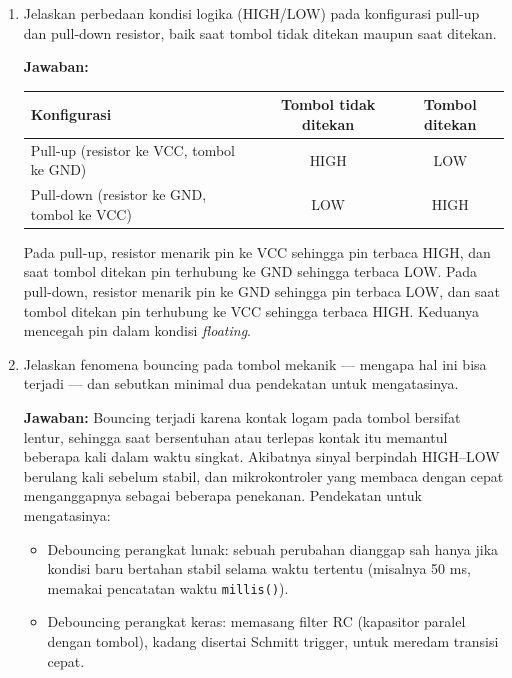 \begin{enumerate}
	Catatan: ketentuan ini berlaku untuk cara yang dipakai pada praktikum. STM32F401 sebenarnya juga memiliki bootloader bawaan (misalnya mode DFU lewat USB), tetapi mode ini tidak dipakai di sini.

	\item Jelaskan perbedaan kondisi logika (HIGH/LOW) pada konfigurasi pull-up dan pull-down resistor, baik saat tombol tidak ditekan maupun saat ditekan.

	\textbf{Jawaban:}

	\begin{table}[H]
		\centering
		\begin{tabular}{|l|c|c|}
			\hline
			\textbf{Konfigurasi} & \textbf{Tombol tidak ditekan} & \textbf{Tombol ditekan} \\
			\hline
			Pull-up (resistor ke VCC, tombol ke GND) & HIGH & LOW \\
			\hline
			Pull-down (resistor ke GND, tombol ke VCC) & LOW & HIGH \\
			\hline
		\end{tabular}
	\end{table}

	Pada pull-up, resistor menarik pin ke VCC sehingga pin terbaca HIGH, dan saat tombol ditekan pin terhubung ke GND sehingga terbaca LOW. Pada pull-down, resistor menarik pin ke GND sehingga pin terbaca LOW, dan saat tombol ditekan pin terhubung ke VCC sehingga terbaca HIGH. Keduanya mencegah pin dalam kondisi \emph{floating}.

	\item Jelaskan fenomena bouncing pada tombol mekanik --- mengapa hal ini bisa terjadi --- dan sebutkan minimal dua pendekatan untuk mengatasinya.

	\textbf{Jawaban:} Bouncing terjadi karena kontak logam pada tombol bersifat lentur, sehingga saat bersentuhan atau terlepas kontak itu memantul beberapa kali dalam waktu singkat. Akibatnya sinyal berpindah HIGH--LOW berulang kali sebelum stabil, dan mikrokontroler yang membaca dengan cepat menganggapnya sebagai beberapa penekanan. Pendekatan untuk mengatasinya:
	\begin{itemize}
		\item Debouncing perangkat lunak: sebuah perubahan dianggap sah hanya jika kondisi baru bertahan stabil selama waktu tertentu (misalnya 50 ms, memakai pencatatan waktu \texttt{millis()}).
		\item Debouncing perangkat keras: memasang filter RC (kapasitor paralel dengan tombol), kadang disertai Schmitt trigger, untuk meredam transisi cepat.
	\end{itemize}


\end{enumerate}
